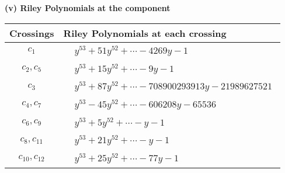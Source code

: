 \documentclass[1p]{elsarticle_modified}
\theoremstyle{definition}
\begin{document}
\flushleft \textbf{(v) Riley Polynomials at the component}\newline \\
\begin{tabular}{m{50pt}|m{274pt}}
Crossings & \hspace{64pt}Riley Polynomials at each crossing \\
\hline $$\begin{aligned}c_{1}\end{aligned}$$&$\begin{aligned}
&y^{53}+51 y^{52}+\cdots-4269 y-1
\end{aligned}$\\
\hline $$\begin{aligned}c_{2},c_{5}\end{aligned}$$&$\begin{aligned}
&y^{53}+15 y^{52}+\cdots-9 y-1
\end{aligned}$\\
\hline $$\begin{aligned}c_{3}\end{aligned}$$&$\begin{aligned}
&y^{53}+87 y^{52}+\cdots-708900293913 y-21989627521
\end{aligned}$\\
\hline $$\begin{aligned}c_{4},c_{7}\end{aligned}$$&$\begin{aligned}
&y^{53}-45 y^{52}+\cdots-606208 y-65536
\end{aligned}$\\
\hline $$\begin{aligned}c_{6},c_{9}\end{aligned}$$&$\begin{aligned}
&y^{53}+5 y^{52}+\cdots- y-1
\end{aligned}$\\
\hline $$\begin{aligned}c_{8},c_{11}\end{aligned}$$&$\begin{aligned}
&y^{53}+21 y^{52}+\cdots- y-1
\end{aligned}$\\
\hline $$\begin{aligned}c_{10},c_{12}\end{aligned}$$&$\begin{aligned}
&y^{53}+25 y^{52}+\cdots-77 y-1
\end{aligned}$\\
\hline
\end{tabular}\\~\\
\end{document}
